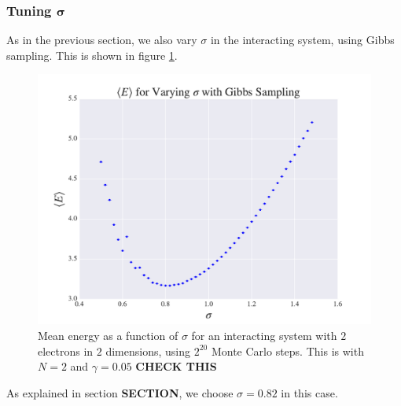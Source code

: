 \documentclass[a4paper, 10pt]{article}
\begin{document}
	 \subsubsection{Tuning $\boldsymbol{\sigma}$}
	As in the previous section, we also vary $\sigma$ in the interacting system, using Gibbs sampling. This is shown in figure \ref{fig:sigma_interacting}.
	 \begin{figure}
	 	\centering
	 	\includegraphics[width=\textwidth]{../Results/varying_sigma_gibbs_interacting.pdf}
	 	\caption{Mean energy as a function of $\sigma$ for an interacting system with $2$ electrons in $2$ dimensions, using $2^{20}$ Monte Carlo steps. This is with $N=2$ and $\gamma=0.05$ \textbf{CHECK THIS}}\label{fig:sigma_interacting}
	 \end{figure}
As explained in section \textbf{SECTION}, we choose $\sigma=0.82$ in this case.
\end{document}
